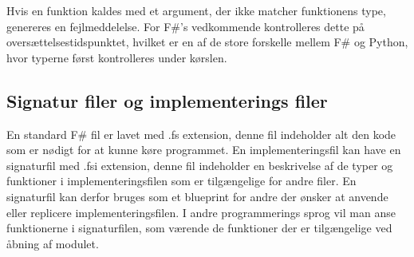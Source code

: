 


Hvis en funktion kaldes med et argument, der ikke matcher funktionens type, genereres en fejlmeddelelse. For F\#'s vedkommende kontrolleres dette på oversættelsestidspunktet, hvilket er en af de store forskelle mellem F\# og Python, hvor typerne først kontrolleres under kørslen.





\subsection{Signatur filer og implementerings filer}
En standard F\# fil er lavet med .fs extension, denne fil indeholder alt den kode som er nødigt for at kunne køre programmet. En implementeringsfil kan have en signaturfil med .fsi extension, denne fil indeholder en beskrivelse af de typer og funktioner i implementeringsfilen som er tilgængelige for andre filer. En signaturfil kan derfor bruges som et blueprint for andre der ønsker at anvende eller replicere implementeringsfilen. I andre programmerings sprog vil man anse funktionerne i signaturfilen, som værende de funktioner der er tilgængelige ved åbning af modulet.

